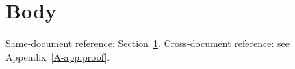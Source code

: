 \documentclass{article}
\begin{document}
\section{Body}\label{sec:body}
Same-document reference: Section~\ref{sec:body}.
Cross-document reference: see Appendix~\ref{A-app:proof}.
\end{document}
